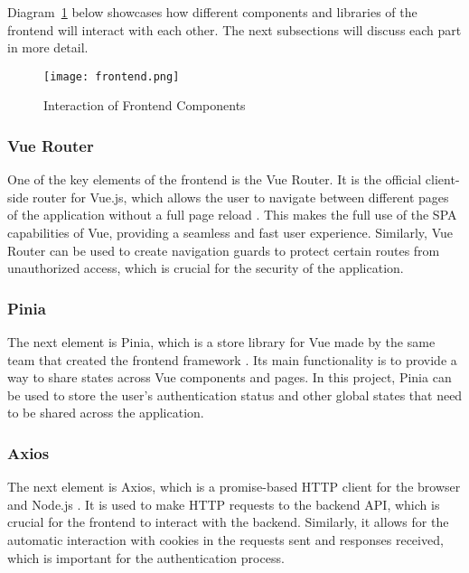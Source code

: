 Diagram~\ref{fig:frontend} below showcases how different components and libraries of the frontend will interact with each other. The next subsections will discuss each part in more detail.

\begin{figure}[htbp]
    \centering
    \texttt{[image: frontend.png]}
    \caption{Interaction of Frontend Components}\label{fig:frontend}
\end{figure}

\FloatBarrier{}
\subsubsection{Vue Router}

One of the key elements of the frontend is the Vue Router. It is the official client-side router for Vue.js, which allows the user to navigate between different pages of the application without a full page reload \parencite{vuerouter}. This makes the full use of the SPA capabilities of Vue, providing a seamless and fast user experience. Similarly, Vue Router can be used to create navigation guards to protect certain routes from unauthorized access, which is crucial for the security of the application.

\subsubsection{Pinia}

The next element is Pinia, which is a store library for Vue made by the same team that created the frontend framework \parencite{pinia}. Its main functionality is to provide a way to share states across Vue components and pages. In this project, Pinia can be used to store the user's authentication status and other global states that need to be shared across the application.

\subsubsection{Axios}

The next element is Axios, which is a promise-based HTTP client for the browser and Node.js \parencite{axios}. It is used to make HTTP requests to the backend API, which is crucial for the frontend to interact with the backend. Similarly, it allows for the automatic interaction with cookies in the requests sent and responses received, which is important for the authentication process.

